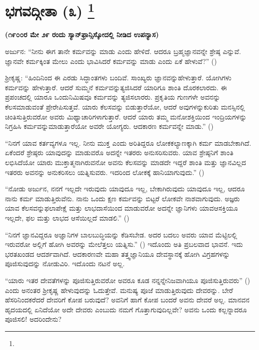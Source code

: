 
\chapter[ಭಾಗವದ್ಗೀತಾ (೩) ]{ಭಗವದ್ಗೀತಾ (೩) \protect\footnote{}}

\centerline{\textbf{(೧೯೦೦ರ ಮೇ ೨೯ ರಂದು ಸ್ಯಾನ್​ಫ್ರಾನ್ಸಿಸ್ಕೋದಲ್ಲಿ ನೀಡಿದ ಉಪನ್ಯಾಸ)}}

ಅರ್ಜುನ: “ನೀನು ಈಗ ತಾನೇ ಕರ್ಮವನ್ನು ಮಾಡು ಎಂದು ಹೇಳಿದೆ. ಆದರೂ ಬ್ರಹ್ಮಜ್ಞಾನವನ್ನೇ ಶ್ರೇಷ್ಠ ಎನ್ನುವೆ. ಜ್ಞಾನವೇ ಕರ್ಮಕ್ಕಿಂತ ಮೇಲು ಎಂದು ಭಾವಿಸಿದರೆ ಕರ್ಮವನ್ನು ಮಾಡು ಎಂದು ಏಕೆ ಹೇಳುವೆ?” ()

ಶ‍್ರೀಕೃಷ್ಣ: “ಹಿಂದಿನಿಂದ ಈ ಎರಡು ಸಿದ್ಧಾಂತಗಳು ಬಂದಿವೆ. ಸಾಂಖ್ಯರು ಜ್ಞಾನವನ್ನು\break ಹೇಳುತ್ತಾರೆ. ಯೋಗಿಗಳು ಕರ್ಮವನ್ನು ಹೇಳುತ್ತಾರೆ. ಆದರೆ ಸುಮ್ಮನೆ ಕರ್ಮವನ್ನು\break ತ್ಯಜಿಸಿದರೆ ಯಾರಿಗೂ ಶಾಂತಿ ದೊರಕಲಾರದು. ಈ ಪ್ರಪಂಚದಲ್ಲಿ ಯಾರೂ ಒಂದು\break ನಿಮಿಷವೂ ಕರ್ಮವನ್ನು ತ್ಯಜಿಸಲಾರರು. ಪ್ರಕೃತಿಯ ಗುಣಗಳೇ ಅವನನ್ನು ಕೆಲಸ\break ಮಾಡುವಂತೆ ಪ್ರೇರೇಪಿಸುತ್ತವೆ. ಯಾರು ಕೆಲಸವನ್ನು ಬಿಡುತ್ತಾರೆಯೋ, ಆದರೆ ಅವುಗಳನ್ನು\break ಕುರಿತು ಮನಸ್ಸಿನಲ್ಲಿ ಚಿಂತಿಸುತ್ತಿರುವರೋ ಅವರು ಮಿಥ್ಯಾಚಾರಿಗಳಾಗುತ್ತಾರೆ. ಆದರೆ ಯಾರು ತಮ್ಮ ಮನೋಶಕ್ತಿಯಿಂದ ಇಂದ್ರಿಯಗಳನ್ನು ನಿಗ್ರಹಿಸಿ ಕರ್ಮವನ್ನು\break ಮಾಡುತ್ತಾರೆಯೋ ಅವರೇ ಯೋಗ್ಯರು. ಆದಕಾರಣ ಕರ್ಮವನ್ನೇ ಮಾಡು.” ()

“ನಿನಗೆ ಯಾವ ಕರ್ತವ್ಯಗಳೂ ಇಲ್ಲ. ನೀನು ಮುಕ್ತ ಎಂದು ಅರಿತಿದ್ದರೂ ಲೋಕಕಲ್ಯಾಣಕ್ಕಾಗಿ ಕರ್ಮ ಮಾಡಬೇಕಾಗಿದೆ. ಏಕೆಂದರೆ ಶ್ರೇಷ್ಠರು ಯಾವುದನ್ನು ಮಾಡುವರೊ ಅದನ್ನೇ ಇತರರು ಅನುಸರಿಸುವರು. ಯಾವ ಶ್ರೇಷ್ಠನಿಗೆ ಶಾಂತಿ ಲಭಿಸಿದೆಯೋ ಯಾರು ಮುಕ್ತಾತ್ಮನಾಗಿರುವನೋ ಅವನು ಕೆಲಸವನ್ನು ಮಾಡದೇ ಇದ್ದರೆ ಶಾಂತಿ ಮತ್ತು ಜ್ಞಾನವಿಲ್ಲದ ಇತರರು ಅವನನ್ನು ಅನುಕರಿಸಲು ಯತ್ನಿಸುವರು. ಇದರಿಂದ ಲೋಕಕ್ಕೆ ಹಾನಿಯಾಗುವುದು.” ()

“ನೋಡು ಅರ್ಜುನ, ನನಗೆ ಇಲ್ಲದೇ ಇರುವುದು ಯಾವುದೂ ಇಲ್ಲ, ಬೇಕಾಗಿರುವುದು ಯಾವುದೂ ಇಲ್ಲ, ಆದರೂ ನಾನು ಕರ್ಮ ಮಾಡುತ್ತಿರುವೆನು. ನಾನು ಒಂದು ಕ್ಷಣ ಕರ್ಮವನ್ನು ಬಿಟ್ಟರೆ ಲೋಕವೇ ನಾಶವಾಗುವುದು. ಅಜ್ಞರು ಯಾವ ಕೆಲಸವನ್ನು\break ಫಲಾಪೇಕ್ಷೆ ಮತ್ತು ಲಾಭದಾಸೆಯಿಂದ ಮಾಡುವರೋ ಅದನ್ನೇ ಜ್ಞಾನಿಗಳು ಯಾವ\break ಆಸಕ್ತಿಯೂ ಇಲ್ಲದೇ, ಫಲ ಮತ್ತು ಲಾಭದ ಆಸೆಯಿಲ್ಲದೆ ಮಾಡಲಿ.” ()

“ನಿನಗೆ ಜ್ಞಾನವಿದ್ದರೂ ಅಜ್ಞಾನಿಗಳ ಬಾಲಬುದ್ಧಿಯನ್ನು ಕೆಡಿಸಬೇಡ. ಅದರ ಬದಲು ಅವರು ಯಾವ ಮೆಟ್ಟಿಲಲ್ಲಿ ಇರುವರೋ ಅಲ್ಲಿಗೆ ಹೋಗಿ ಅವರನ್ನು ಮೇಲೆತ್ತಲು ಯತ್ನಿಸು.” () ಇದೊಂದು ಅತಿ ಪ್ರಬಲವಾದ ಭಾವನೆ. ಇದು ಭರತಖಂಡದ ಆದರ್ಶವಾಗಿದೆ. ಆದಕಾರಣವೇ ಮಹಾ ತತ್ತ್ವಜ್ಞಾನಿಯೂ ದೇವಸ್ಥಾನಕ್ಕೆ ಹೋಗಿ ವಿಗ್ರಹಗಳನ್ನು ಪೂಜಿಸುವುದನ್ನು ನೋಡುವಿರಿ. ಇದೊಂದು ನಟನೆ ಅಲ್ಲ.

“ಯಾರು ಇತರ ದೇವತೆಗಳನ್ನು ಪೂಜಿಸುತ್ತಿರುವರೋ ಅವರೂ ಕೂಡ ನನ್ನನ್ನೇ\break ನಿಜವಾಗಿಯೂ ಪೂಜಿಸುತ್ತಿರುವರು” () ಎಂದು ಅನಂತರ ಶ‍್ರೀಕೃಷ್ಣ ಹೇಳುವುದನ್ನು ಓದುತ್ತೇವೆ. ಮನುಷ್ಯ ಪೂಜೆ ಮಾಡುತ್ತಿರುವುದು ದೇವರನ್ನು. ಬೇರೆ ಹೆಸರಿನಿಂದ\break ಕರೆದರೆ ದೇವರಿಗೆ ಕೋಪ ಬರುವುದೆ? ಅವನಿಗೆ ಹಾಗೆ ಕೋಪ ಬಂದರೆ ಅವನು ದೇವರೆ ಅಲ್ಲ. ಮಾನವನ ಹೃದಯದಲ್ಲಿ ಏನಿದೆಯೋ ಅದೇ ದೇವರು ಎಂಬುದು ನಮಗೆ ಗೊತ್ತಾಗುವುದಿಲ್ಲವೇ? ಅವನು ಒಂದು ಕಲ್ಲನ್ನಾದರೂ ಪೂಜಿಸಲಿ! ಅದರಿಂದೇನು?

